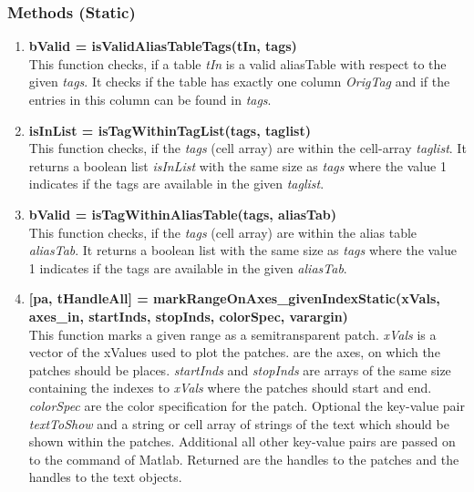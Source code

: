 \documentclass[a4]{scrreprt}
\begin{document}
\subsubsection{Methods (Static)}
\label{sssec:mdtsObj:MethodsStatic}
\begin{enumerate}
	
	\item \textbf{bValid = isValidAliasTableTags(tIn, tags)}\\
	This function checks, if a table \textit{tIn} is a valid aliasTable with respect to the given \textit{tags}. It checks if the table has exactly one column \textit{OrigTag} and if the entries in this column can be found in \textit{tags}.
	
	\item \textbf{isInList = isTagWithinTagList(tags, taglist)}\\
	This function checks, if the \textit{tags} (cell array) are within the cell-array  \textit{taglist}. It returns a boolean list \textit{isInList} with the same size as \textit{tags} where the value 1 indicates if the tags are available in the given \textit{taglist}.
	
	\item \textbf{bValid = isTagWithinAliasTable(tags, aliasTab)}\\
	This function checks, if the \textit{tags} (cell array) are within the alias table  \textit{aliasTab}. It returns a boolean list with the same size as \textit{tags} where the value 1 indicates if the tags are available in the given \textit{aliasTab}.
	
	\item \textbf{[pa, tHandleAll] = markRangeOnAxes\_givenIndexStatic(xVals, axes\_in, startInds, stopInds, colorSpec, varargin)}\\
	This function marks a given range as a semitransparent patch. \textit{xVals} is a vector of the xValues used to plot the patches.  are the axes, on which the patches should be places. \textit{startInds} and \textit{stopInds} are arrays of the same size containing the indexes to \textit{xVals} where the patches should start and end. \textit{colorSpec} are the color specification for the patch. Optional the key-value pair \textit{textToShow} and a string or cell array of strings of the text which should be shown within the patches. Additional all other key-value pairs are passed on to the  command of Matlab. Returned are the handles to the patches and the handles to the text objects.
	
	
\end{enumerate}
\end{document}

